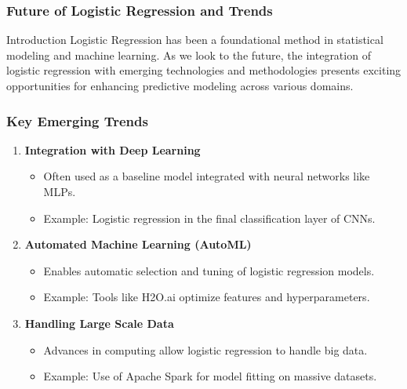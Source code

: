 \documentclass[aspectratio=169]{beamer}
\begin{document}
\begin{frame}[fragile]
  \frametitle{Future of Logistic Regression and Trends}
  
  \begin{block}{Introduction}
    Logistic Regression has been a foundational method in statistical modeling and machine learning. As we look to the future, the integration of logistic regression with emerging technologies and methodologies presents exciting opportunities for enhancing predictive modeling across various domains.
  \end{block}
  
\end{frame}

\begin{frame}[fragile]
  \frametitle{Key Emerging Trends}

  \begin{enumerate}
    \item \textbf{Integration with Deep Learning}
      \begin{itemize}
        \item Often used as a baseline model integrated with neural networks like MLPs.
        \item Example: Logistic regression in the final classification layer of CNNs.
      \end{itemize}
      
    \item \textbf{Automated Machine Learning (AutoML)}
      \begin{itemize}
        \item Enables automatic selection and tuning of logistic regression models.
        \item Example: Tools like H2O.ai optimize features and hyperparameters.
      \end{itemize}
      
    \item \textbf{Handling Large Scale Data}
      \begin{itemize}
        \item Advances in computing allow logistic regression to handle big data.
        \item Example: Use of Apache Spark for model fitting on massive datasets.
      \end{itemize}
  \end{enumerate}
  
\end{frame}
\end{document}
